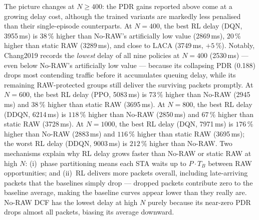 \documentclass[conference]{IEEEtran}
\begin{document}
The picture changes at $N \geq 400$: the PDR gains reported above come at a
growing delay cost, although the trained variants are markedly less
penalised than their single-episode counterparts.
At $N = 400$, the best RL delay (DQN, 3955\,ms) is $38\,\%$ higher than
No-RAW's artificially low value (2869\,ms), $20\,\%$ higher than static RAW
(3289\,ms), and close to LACA (3749\,ms, $+5\,\%$).
Notably, Chang2019 records the \emph{lowest} delay of all nine policies at
$N=400$ (2530\,ms) — even below No-RAW's artificially low value — because
its collapsing PDR (0.188) drops most contending traffic before it
accumulates queuing delay, while its remaining RAW-protected groups still
deliver the surviving packets promptly.
At $N = 600$, the best RL delay (PPO, 5083\,ms) is $73\,\%$ higher than
No-RAW (2945\,ms) and $38\,\%$ higher than static RAW (3695\,ms).
At $N = 800$, the best RL delay (DDQN, 6214\,ms) is $118\,\%$ higher
than No-RAW (2850\,ms) and $67\,\%$ higher than static RAW (3728\,ms).
At $N = 1000$, the best RL delay (DQN, 7971\,ms) is $176\,\%$ higher
than No-RAW (2883\,ms) and $116\,\%$ higher than static RAW (3695\,ms); the
worst RL delay (DDQN, 9003\,ms) is $212\,\%$ higher than No-RAW.
Two mechanisms explain why RL delay grows faster than No-RAW or static RAW
at high $N$: (i)~phase partitioning means each STA waits up to $P \cdot T_B$
between RAW opportunities; and (ii)~RL delivers more packets overall,
including late-arriving packets that the baselines simply drop — dropped
packets contribute zero to the baseline average, making the baseline curves
appear lower than they really are.
No-RAW DCF has the lowest delay at high $N$ purely because its near-zero
PDR drops almost all packets, biasing its average downward.
\end{document}
